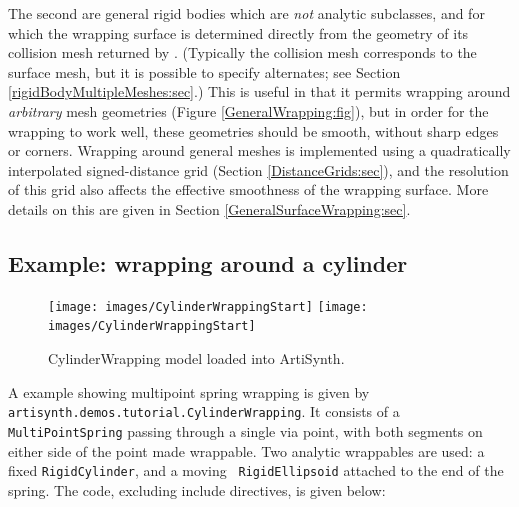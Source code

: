 The second are general rigid bodies which are {\it not} analytic
subclasses, and for which the wrapping surface is determined directly
from the geometry of its collision mesh returned by
.  (Typically the
collision mesh corresponds to the surface mesh, but it is possible to
specify alternates; see Section \ref{rigidBodyMultipleMeshes:sec}.)
This is useful in that it permits wrapping around {\it arbitrary} mesh
geometries (Figure \ref{GeneralWrapping:fig}), but in order for the
wrapping to work well, these geometries should be smooth, without
sharp edges or corners.  Wrapping around general meshes is implemented
using a quadratically interpolated signed-distance grid (Section
\ref{DistanceGrids:sec}), and the resolution of this grid also affects
the effective smoothness of the wrapping surface. More details on this
are given in Section \ref{GeneralSurfaceWrapping:sec}.

\subsection{Example: wrapping around a cylinder}
\label{CylinderWrapping:sec}

\begin{figure}[t]
\begin{center}
\iflatexml
 \texttt{[image: images/CylinderWrappingStart]}
\else
 \texttt{[image: images/CylinderWrappingStart]}
\fi
\end{center}
\caption{CylinderWrapping model loaded into ArtiSynth.}
\label{CylinderWrapping:fig}
\end{figure}

A example showing multipoint spring wrapping is given by {\tt
artisynth.demos.tutorial.CylinderWrapping}.  It consists of a
{\tt MultiPointSpring} passing through a single via point, with both
segments on either side of the point made wrappable. Two analytic
wrappables are used: a fixed {\tt RigidCylinder}, and a moving {\tt
RigidEllipsoid} attached to the end of the spring. The code, excluding
include directives, is given below: 

\lstset{numbers=left} 
\iflatexml

\else

\fi
\lstset{numbers=none}

